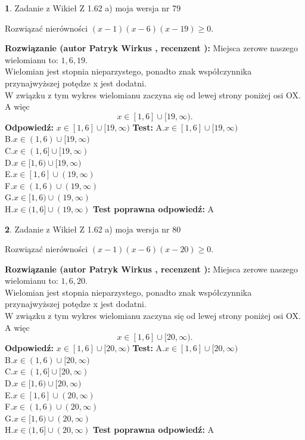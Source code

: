\documentclass[12pt, a4paper]{article}
\theoremstyle{definition} %
\newtheorem{zad}{}
\newcommand{\zadStart}[1]{\begin{zad}#1\newline}
\newcommand{\zadStop}{\end{zad}}
\newcommand{\rozwStart}[2]{\noindent \textbf{Rozwiązanie (autor #1 , recenzent #2): }\newline}
\newcommand{\rozwStop}{\newline}
\newcommand{\odpStart}{\noindent \textbf{Odpowiedź:}\newline}
\newcommand{\odpStop}{\newline}
\newcommand{\testStart}{\noindent \textbf{Test:}\newline}
\newcommand{\testStop}{\newline}
\newcommand{\kluczStart}{\noindent \textbf{Test poprawna odpowiedź:}\newline}
\newcommand{\kluczStop}{\newline}
\begin{document}
\zadStart{Zadanie z Wikieł Z 1.62 a) moja wersja nr 79}

Rozwiązać nierówności $(x-1)(x-6)(x-19)\ge0$.
\zadStop
\rozwStart{Patryk Wirkus}{}
Miejsca zerowe naszego wielomianu to: $1, 6, 19$.\\
Wielomian jest stopnia nieparzystego, ponadto znak współczynnika przy\linebreak najwyższej potędze x jest dodatni.\\ W związku z tym wykres wielomianu zaczyna się od lewej strony poniżej osi OX. A więc $$x \in [1,6] \cup [19,\infty).$$
\rozwStop
\odpStart
$x \in [1,6] \cup [19,\infty)$
\odpStop
\testStart
A.$x \in [1,6] \cup [19,\infty)$\\
B.$x \in (1,6) \cup [19,\infty)$\\
C.$x \in (1,6] \cup [19,\infty)$\\
D.$x \in [1,6) \cup [19,\infty)$\\
E.$x \in [1,6] \cup (19,\infty)$\\
F.$x \in (1,6) \cup (19,\infty)$\\
G.$x \in [1,6) \cup (19,\infty)$\\
H.$x \in (1,6] \cup (19,\infty)$
\testStop
\kluczStart
A
\kluczStop



\zadStart{Zadanie z Wikieł Z 1.62 a) moja wersja nr 80}

Rozwiązać nierówności $(x-1)(x-6)(x-20)\ge0$.
\zadStop
\rozwStart{Patryk Wirkus}{}
Miejsca zerowe naszego wielomianu to: $1, 6, 20$.\\
Wielomian jest stopnia nieparzystego, ponadto znak współczynnika przy\linebreak najwyższej potędze x jest dodatni.\\ W związku z tym wykres wielomianu zaczyna się od lewej strony poniżej osi OX. A więc $$x \in [1,6] \cup [20,\infty).$$
\rozwStop
\odpStart
$x \in [1,6] \cup [20,\infty)$
\odpStop
\testStart
A.$x \in [1,6] \cup [20,\infty)$\\
B.$x \in (1,6) \cup [20,\infty)$\\
C.$x \in (1,6] \cup [20,\infty)$\\
D.$x \in [1,6) \cup [20,\infty)$\\
E.$x \in [1,6] \cup (20,\infty)$\\
F.$x \in (1,6) \cup (20,\infty)$\\
G.$x \in [1,6) \cup (20,\infty)$\\
H.$x \in (1,6] \cup (20,\infty)$
\testStop
\kluczStart
A
\kluczStop
\end{document}
